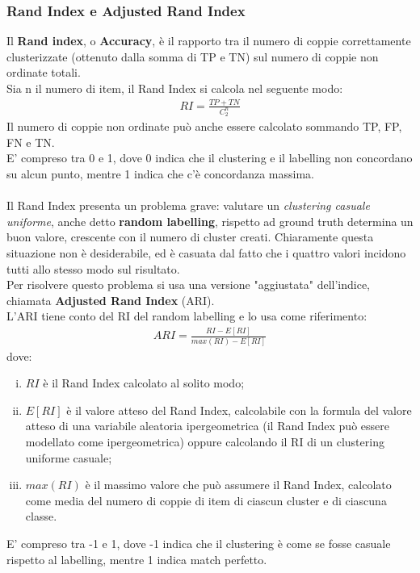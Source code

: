 \subsubsection{Rand Index e Adjusted Rand Index}
Il \textbf{Rand index}, o \textbf{Accuracy}, è il rapporto tra il numero di coppie correttamente clusterizzate (ottenuto dalla somma di TP e TN) sul numero di coppie non ordinate totali.\\
Sia n il numero di item, il Rand Index si calcola nel seguente modo:
\begin{align}
RI = \frac{TP + TN}{C_2^n}
\end{align}
Il numero di coppie non ordinate può anche essere calcolato sommando TP, FP, FN e TN.\\
E' compreso tra 0 e 1, dove 0 indica che il clustering e il labelling non concordano su alcun punto, mentre 1 indica che c'è concordanza massima.\\
\\
Il Rand Index presenta un problema grave: valutare un \textit{clustering casuale uniforme}, anche detto \textbf{random labelling}, rispetto ad ground truth determina un buon valore, crescente con il numero di cluster creati. Chiaramente questa situazione non è desiderabile, ed è casuata dal fatto che i quattro valori incidono tutti allo stesso modo sul risultato.\\
Per risolvere questo problema si usa una versione "aggiustata" dell'indice, chiamata \textbf{Adjusted Rand Index} (ARI)\cite{ari}.\\
L'ARI tiene conto del RI del random labelling e lo usa come riferimento:
\begin{align}
ARI = \frac{RI - E[RI]}{max(RI) - E[RI]}
\end{align}
dove:
\begin{enumerate}[(i)]
	\item $ RI $ è il Rand Index calcolato al solito modo;
	\item $ E[RI] $ è il valore atteso del Rand Index, calcolabile con la formula del valore atteso di una variabile aleatoria ipergeometrica (il Rand Index può essere modellato come ipergeometrica) oppure calcolando il RI di un clustering uniforme casuale;
	\item $ max(RI) $ è il massimo valore che può assumere il Rand Index, calcolato come media del numero di coppie di item di ciascun cluster e di ciascuna classe.
\end{enumerate}
E' compreso tra -1 e 1, dove -1 indica che il clustering è come se fosse casuale rispetto al labelling, mentre 1 indica match perfetto.\\

